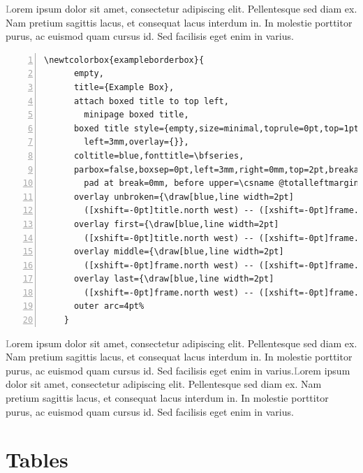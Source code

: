 \documentclass{article}
\def\gray{\textcolor{gray}}
\def\loremI{Lorem ipsum dolor sit amet, consectetur adipiscing elit. 
Pellentesque sed diam ex. Nam pretium sagittis lacus, et consequat lacus 
interdum in. In molestie porttitor purus, ac euismod quam cursus id. 
Sed facilisis eget enim in varius.}
\def\lorem{\gray\loremI}
\begin{document}



\begin{exampleborderbox}
  \lorem
  \begin{lstlisting}[backgroundcolor=\color{backcolor},numbers=left,gobble=4,numbersep=3pt,xleftmargin=5pt,lineskip=-.7ex,alsoletter=\\]
    \newtcolorbox{exampleborderbox}{
      empty,
      title={Example Box},
      attach boxed title to top left,
        minipage boxed title,
      boxed title style={empty,size=minimal,toprule=0pt,top=1pt,
        left=3mm,overlay={}},
      coltitle=blue,fonttitle=\bfseries,
      parbox=false,boxsep=0pt,left=3mm,right=0mm,top=2pt,breakable,
        pad at break=0mm, before upper=\csname @totalleftmargin\endcsname0pt, 
      overlay unbroken={\draw[blue,line width=2pt] 
        ([xshift=-0pt]title.north west) -- ([xshift=-0pt]frame.south west); },
      overlay first={\draw[blue,line width=2pt] 
        ([xshift=-0pt]title.north west) -- ([xshift=-0pt]frame.south west); },
      overlay middle={\draw[blue,line width=2pt] 
        ([xshift=-0pt]frame.north west) -- ([xshift=-0pt]frame.south west); },
      overlay last={\draw[blue,line width=2pt] 
        ([xshift=-0pt]frame.north west) -- ([xshift=-0pt]frame.south west); },
      outer arc=4pt%
    }
  \end{lstlisting}
  \begin{mdframed}
    \lorem \lorem
  \end{mdframed}
\end{exampleborderbox}


\section{Tables}
\end{document}
